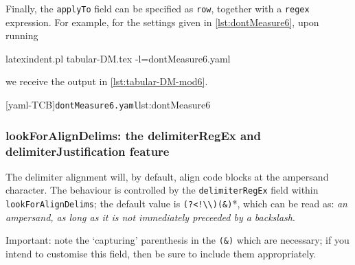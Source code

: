  \begin{example}
 Finally, the \texttt{applyTo} field can be specified as \texttt{row}, together with a
 \texttt{regex} expression. For example, for the settings given in
 \cref{lst:dontMeasure6}, upon running 

 \begin{commandshell} 
latexindent.pl tabular-DM.tex -l=dontMeasure6.yaml
\end{commandshell}

 we receive the output in \cref{lst:tabular-DM-mod6}.  

 \begin{cmhtcbraster}
  [yaml-TCB]{\texttt{dontMeasure6.yaml}}{lst:dontMeasure6}
 \end{cmhtcbraster}
 \end{example}

\subsubsection{lookForAlignDelims: the delimiterRegEx and delimiterJustification feature}\label{sec:delimiter-reg-ex}

 The delimiter alignment  will, by default,
 align code blocks at the ampersand character. The behaviour is controlled by the
 \texttt{delimiterRegEx} field within \texttt{lookForAlignDelims}; the default value is
 \lstinline*'(?<!\\)(&)'*, which can be read as: \emph{an ampersand, as long as it is not
 immediately preceeded by a backslash}.    

 \begin{warning}
  Important: note the `capturing' parenthesis in the \lstinline!(&)! which are necessary;
  if you intend to customise this field, then be sure to include them appropriately.
 \end{warning}

